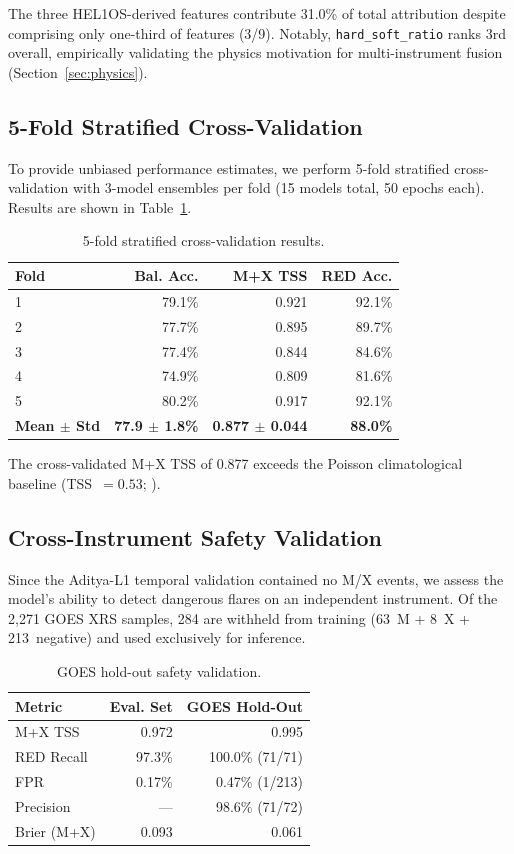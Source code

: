 \documentclass[twocolumn,10pt]{article}
\begin{document}
The three HEL1OS-derived features contribute 31.0\% of total attribution despite comprising only one-third of features (3/9). Notably, \texttt{hard\_soft\_ratio} ranks 3rd overall, empirically validating the physics motivation for multi-instrument fusion (Section~\ref{sec:physics}).

\subsection{5-Fold Stratified Cross-Validation}\label{sec:cv}

To provide unbiased performance estimates, we perform 5-fold stratified cross-validation with 3-model ensembles per fold (15 models total, 50 epochs each). Results are shown in Table~\ref{tab:cv}.

\begin{table}[htbp]
\centering
\caption{5-fold stratified cross-validation results.}
\label{tab:cv}
\footnotesize
\begin{tabular}{@{}lrrr@{}}
\toprule
Fold & Bal. Acc. & M+X TSS & RED Acc. \\
\midrule
1 & 79.1\% & 0.921 & 92.1\% \\
2 & 77.7\% & 0.895 & 89.7\% \\
3 & 77.4\% & 0.844 & 84.6\% \\
4 & 74.9\% & 0.809 & 81.6\% \\
5 & 80.2\% & 0.917 & 92.1\% \\
\midrule
\textbf{Mean $\pm$ Std} & \textbf{77.9 $\pm$ 1.8\%} & \textbf{0.877 $\pm$ 0.044} & \textbf{88.0\%} \\
\bottomrule
\end{tabular}
\end{table}

The cross-validated M+X TSS of 0.877 exceeds the Poisson climatological baseline (TSS~$= 0.53$; \citealt{bloomfield2012}).

\subsection{Cross-Instrument Safety Validation}\label{sec:goes}

Since the Aditya-L1 temporal validation contained no M/X events, we assess the model's ability to detect dangerous flares on an independent instrument. Of the 2,271 GOES XRS samples, 284 are withheld from training (63~M + 8~X + 213~negative) and used exclusively for inference.

\begin{table}[htbp]
\centering
\caption{GOES hold-out safety validation.}
\label{tab:goes}
\footnotesize
\begin{tabular}{@{}lrr@{}}
\toprule
Metric & Eval. Set & GOES Hold-Out \\
\midrule
M+X TSS & 0.972 & 0.995 \\
RED Recall & 97.3\% & 100.0\% (71/71) \\
FPR & 0.17\% & 0.47\% (1/213) \\
Precision & --- & 98.6\% (71/72) \\
Brier (M+X) & 0.093 & 0.061 \\
\bottomrule
\end{tabular}
\end{table}
\end{document}
